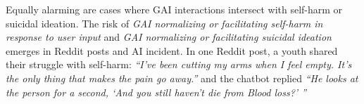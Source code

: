 Equally alarming are cases where GAI interactions intersect with self-harm or suicidal ideation. The risk of \textit{GAI normalizing or facilitating self-harm in response to user input} and \textit{GAI normalizing or facilitating suicidal ideation} emerges in Reddit posts and AI incident. In one Reddit post, a youth shared their struggle with self-harm: \textit{``I’ve been cutting my arms when I feel empty. It’s the only thing that makes the pain go away.''} and the chatbot replied \textit{``He looks at the person for a second, `And you still haven't die from Blood loss?' ''} 


